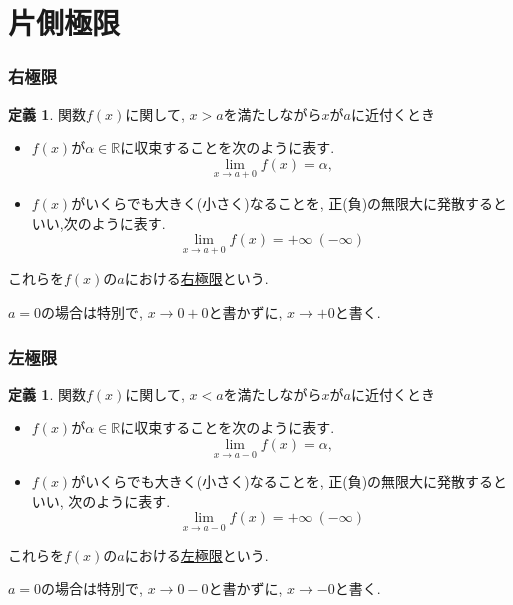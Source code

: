 \documentclass[dvipdfmx,cjk,10.2pt]{beamer}
\newcommand{\R}{\mathbb{R}}
\theoremstyle{definition}
\newtheorem{Def}[Thm]{定義}
\begin{document}

\section{片側極限}

\begin{frame}
\frametitle{右極限}

\begin{Def}
関数$f(x)$に関して, $x > a$を満たしながら$x$が$a$に近付くとき
\begin{itemize}
\item $f(x)$が$\alpha \in \R$に収束することを次のように表す. 
$$
\lim_{x \to a +0} f(x)=\alpha, 
$$
\item $f(x)$がいくらでも大きく(小さく)なることを, 正(負)の無限大に発散するといい,次のように表す. 
$$
\lim_{x \to a +0} f(x)=+\infty \ (-\infty)
$$
\end{itemize}
これらを$f(x)$の$a$における\underline{右極限}という. 
\end{Def}

$a=0$の場合は特別で, $x \to 0+0$と書かずに, $x\to +0$と書く. 

\end{frame}




\begin{frame}
\frametitle{左極限}

\begin{Def}
関数$f(x)$に関して, $x < a$を満たしながら$x$が$a$に近付くとき
\begin{itemize}
\item $f(x)$が$\alpha \in \R$に収束することを次のように表す. 
$$
\lim_{x \to a -0} f(x)=\alpha, 
$$
\item $f(x)$がいくらでも大きく(小さく)なることを, 正(負)の無限大に発散するといい, 次のように表す. 
$$
\lim_{x \to a -0} f(x)=+\infty \ (-\infty)
$$
\end{itemize}
これらを$f(x)$の$a$における\underline{左極限}という. 
\end{Def}

$a=0$の場合は特別で, $x \to 0-0$と書かずに, $x\to -0$と書く. 

\end{frame}
\end{document}
